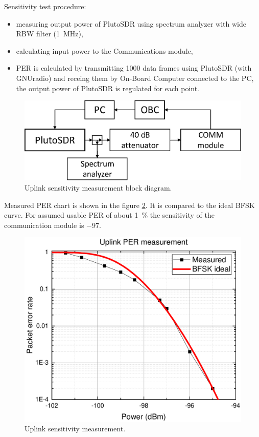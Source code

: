 Sensitivity test procedure:
\begin{itemize}
    \item measuring output power of PlutoSDR using spectrum analyzer with wide RBW filter (\SI{1}{\MHz}),
    \item calculating input power to the Communications module,
    \item PER is calculated by transmitting \si{1000} data frames using PlutoSDR (with GNUradio) and receing them by On-Board Computer connected to the PC, the output power of PlutoSDR is regulated for each point.
\end{itemize}

\begin{figure}[h]
    \centering
    \includegraphics[width=0.6\paperwidth]{img/6/uplink_sensitivity.eps}
    \caption{Uplink sensitivity measurement block diagram.}
    \label{4_uplink_sensitivity}
\end{figure}

Measured PER chart is shown in the figure \ref{4_uplink_sensitivity_graph}. It is compared to the ideal BFSK curve. For assumed usable PER of about \SI{1}{\percent} the sensitivity of the communication module is \SI{-97}{\dBm}.

\begin{figure}[H]
    \centering
    \includegraphics[width=0.8\paperwidth]{img/6/uplink_per.pdf}
    \caption{Uplink sensitivity measurement.}
    \label{4_uplink_sensitivity_graph}
\end{figure}


